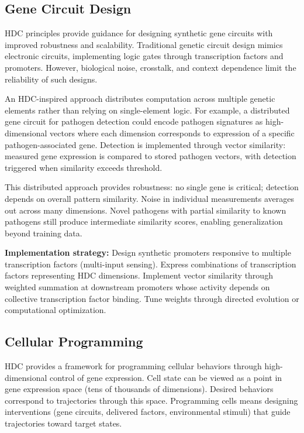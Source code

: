 \documentclass[12pt]{article}
\begin{document}
\subsection{Gene Circuit Design}

HDC principles provide guidance for designing synthetic gene circuits with improved robustness and scalability. Traditional genetic circuit design mimics electronic circuits, implementing logic gates through transcription factors and promoters. However, biological noise, crosstalk, and context dependence limit the reliability of such designs.

An HDC-inspired approach distributes computation across multiple genetic elements rather than relying on single-element logic. For example, a distributed gene circuit for pathogen detection could encode pathogen signatures as high-dimensional vectors where each dimension corresponds to expression of a specific pathogen-associated gene. Detection is implemented through vector similarity: measured gene expression is compared to stored pathogen vectors, with detection triggered when similarity exceeds threshold.

This distributed approach provides robustness: no single gene is critical; detection depends on overall pattern similarity. Noise in individual measurements averages out across many dimensions. Novel pathogens with partial similarity to known pathogens still produce intermediate similarity scores, enabling generalization beyond training data.

\textbf{Implementation strategy:} Design synthetic promoters responsive to multiple transcription factors (multi-input sensing). Express combinations of transcription factors representing HDC dimensions. Implement vector similarity through weighted summation at downstream promoters whose activity depends on collective transcription factor binding. Tune weights through directed evolution or computational optimization.

\subsection{Cellular Programming}

HDC provides a framework for programming cellular behaviors through high-dimensional control of gene expression. Cell state can be viewed as a point in gene expression space (tens of thousands of dimensions). Desired behaviors correspond to trajectories through this space. Programming cells means designing interventions (gene circuits, delivered factors, environmental stimuli) that guide trajectories toward target states.
\end{document}
